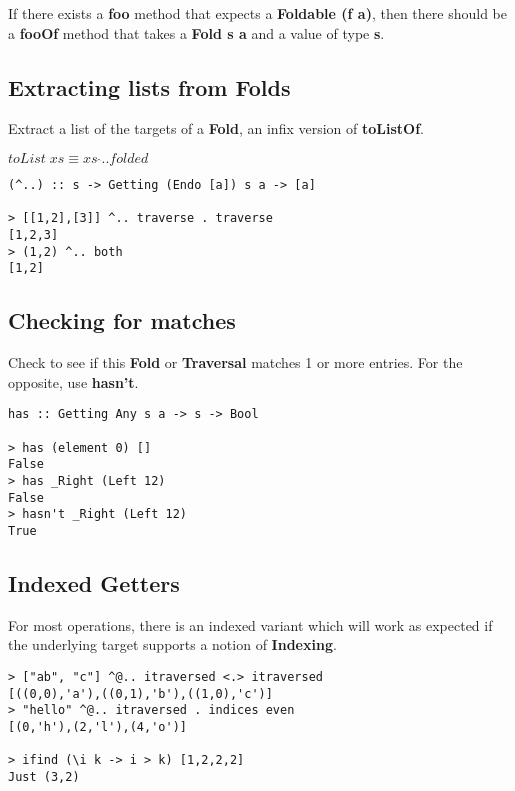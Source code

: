 \begin{multicols}{2}
\begin{box1}
If there exists a \textbf{foo} method that expects a
\textbf{Foldable (f a)}, then there should be a \textbf{fooOf} method that
takes a \textbf{Fold s a} and a value of type \textbf{s}.

\end{box1}

\begin{box2}
\subsection *{Extracting lists from Folds}

Extract a list of the targets of a \textbf{Fold}, an infix version of
\textbf{toListOf}.

$ toList\;xs \equiv xs\;\hat{}.. folded $

\begin{verbatim}
(^..) :: s -> Getting (Endo [a]) s a -> [a] 

> [[1,2],[3]] ^.. traverse . traverse
[1,2,3]
> (1,2) ^.. both
[1,2]
\end{verbatim}
\end{box2}

\begin{box1}
\subsection *{Checking for matches}

Check to see if this \textbf{Fold} or \textbf{Traversal} matches 1 or more entries. For the
opposite, use \textbf{hasn't}.

\begin{verbatim}
has :: Getting Any s a -> s -> Bool

> has (element 0) []
False
> has _Right (Left 12)
False
> hasn't _Right (Left 12)
True
\end{verbatim}
\end{box1}


\begin{box2}
\subsection*{Indexed Getters}
For most operations, there is an indexed variant which will work as expected if
the underlying target supports a notion of \textbf{Indexing}.

\begin{verbatim}
> ["ab", "c"] ^@.. itraversed <.> itraversed  
[((0,0),'a'),((0,1),'b'),((1,0),'c')]
> "hello" ^@.. itraversed . indices even
[(0,'h'),(2,'l'),(4,'o')]

> ifind (\i k -> i > k) [1,2,2,2]
Just (3,2)
\end{verbatim}
\end{box2}
\end{multicols}
\newpage

